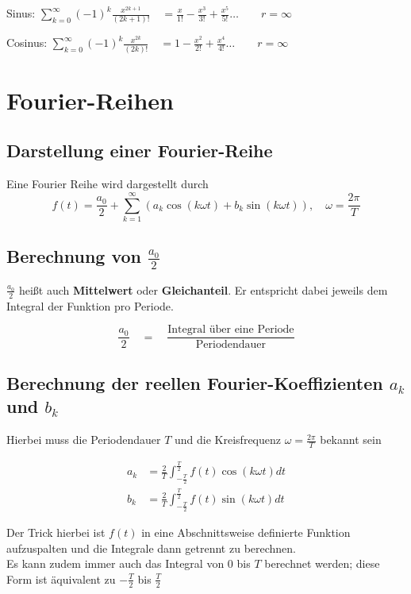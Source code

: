 \documentclass[12pt, a4paper]{scrreprt}
\begin{document}
Sinus: \hfill
\(
\sum_{k=0}^{\infty}(-1)^k\frac{x^{2k+1}}{(2k+1)!} \quad = \frac{x}{1!} - \frac{x^3}{3!} + \frac{x^5}{5!} \dots \qquad r = \infty
\)

Cosinus: \hfill
\(
\sum_{k=0}^{\infty}(-1)^k\frac{x^{2k}}{(2k)!} \quad = 1 - \frac{x^2}{2!} + \frac{x^4}{4!} \dots \qquad r = \infty
\)

\clearpage

\setcounter{chapter}{15}

\chapter{Fourier-Reihen}

\section{Darstellung einer Fourier-Reihe}
Eine Fourier Reihe wird dargestellt durch
\[
  f(t) = \frac{a_0}{2} + \sum_{k=1}^{\infty}(a_k \cos (k \omega t) + b_k \sin (k \omega t)), \quad \omega = \frac{2 \pi}{T}
\]

\section{Berechnung von \(\frac{a_0}{2}\)}

\(\frac{a_0}{2}\) heißt auch \textbf{Mittelwert} oder \textbf{Gleichanteil}. Er entspricht dabei jeweils dem Integral der Funktion pro Periode.

\[
  \frac{a_0}{2} \quad = \quad \frac{\text{Integral über eine Periode}}{\text{Periodendauer}}
\]

\section{Berechnung der reellen Fourier-Koeffizienten \(a_k\) und \(b_k\)}

Hierbei muss die Periodendauer \(T\) und die Kreisfrequenz \(\omega = \frac{2\pi}{T}\) bekannt sein

\begin{align*}
  a_k &= \frac{2}{T} \int_{-\frac{T}{2}}^{\frac{T}{2}}f(t) \cos (k \omega t) dt\\[10pt]
  b_k &= \frac{2}{T} \int_{-\frac{T}{2}}^{\frac{T}{2}}f(t) \sin (k \omega t) dt
\end{align*}

Der Trick hierbei ist \(f(t)\) in eine Abschnittsweise definierte Funktion aufzuspalten und die Integrale dann getrennt zu berechnen.\\
Es kann zudem immer auch das Integral von \(0\) bis \(T\) berechnet werden; diese Form ist äquivalent zu \(-\frac{T}{2}\) bis \(\frac{T}{2}\)
\end{document}
